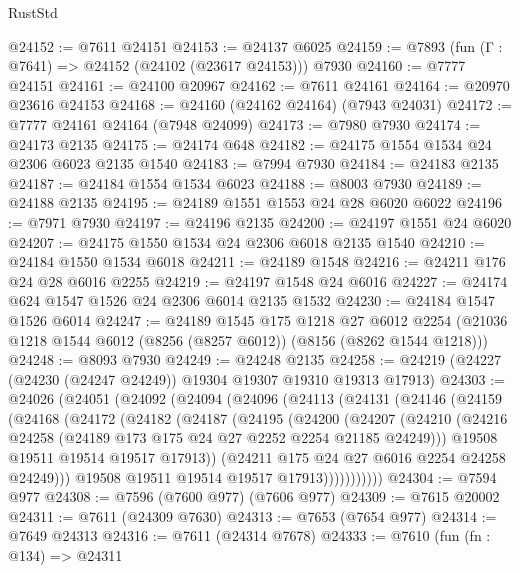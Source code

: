 \begin{lexlean}{RustStd}
\begin{coremodule}
@24152 := @7611 @24151
@24153 := @24137 @6025
@24159 := @7893 (fun (Γ : @7641) => @24152 (@24102 (@23617 @24153))) @7930
@24160 := @7777 @24151
@24161 := @24100 @20967
@24162 := @7611 @24161
@24164 := @20970 @23616 @24153
@24168 := @24160 (@24162 @24164) (@7943 @24031)
@24172 := @7777 @24161 @24164 (@7948 @24099)
@24173 := @7980 @7930
@24174 := @24173 @2135
@24175 := @24174 @648
@24182 := @24175 @1554 @1534 @24 @2306 @6023 @2135 @1540
@24183 := @7994 @7930
@24184 := @24183 @2135
@24187 := @24184 @1554 @1534 @6023
@24188 := @8003 @7930
@24189 := @24188 @2135
@24195 := @24189 @1551 @1553 @24 @28 @6020 @6022
@24196 := @7971 @7930
@24197 := @24196 @2135
@24200 := @24197 @1551 @24 @6020
@24207 := @24175 @1550 @1534 @24 @2306 @6018 @2135 @1540
@24210 := @24184 @1550 @1534 @6018
@24211 := @24189 @1548
@24216 := @24211 @176 @24 @28 @6016 @2255
@24219 := @24197 @1548 @24 @6016
@24227 := @24174 @624 @1547 @1526 @24 @2306 @6014 @2135 @1532
@24230 := @24184 @1547 @1526 @6014
@24247 := @24189
    @1545
    @175
    @1218
    @27
    @6012
    @2254
    (@21036 @1218 @1544 @6012 (@8256 (@8257 @6012)) (@8156 (@8262 @1544 @1218)))
@24248 := @8093 @7930
@24249 := @24248 @2135
@24258 := @24219 (@24227 (@24230 (@24247 @24249)) @19304 @19307 @19310 @19313 @17913)
@24303 := @24026
    (@24051
      (@24092
        (@24094
          (@24096
            (@24113
              (@24131
                (@24146
                  (@24159
                    (@24168
                      (@24172
                        (@24182
                          (@24187
                            (@24195
                              (@24200
                                (@24207
                                  (@24210
                                    (@24216
                                      @24258
                                      (@24189 @173 @175 @24 @27 @2252 @2254 @21185 @24249)))
                                  @19508
                                  @19511
                                  @19514
                                  @19517
                                  @17913))
                              (@24211 @175 @24 @27 @6016 @2254 @24258 @24249)))
                          @19508
                          @19511
                          @19514
                          @19517
                          @17913)))))))))))
@24304 := @7594 @977
@24308 := @7596 (@7600 @977) (@7606 @977)
@24309 := @7615 @20002
@24311 := @7611 (@24309 @7630)
@24313 := @7653 (@7654 @977)
@24314 := @7649 @24313
@24316 := @7611 (@24314 @7678)
@24333 := @7610
    (fun (fn : @134) =>
    @24311

\end{coremodule}
\end{lexlean}
